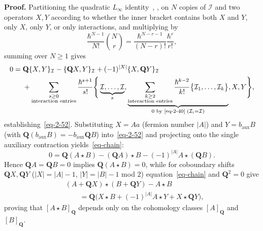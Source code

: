 \documentclass[11pt]{article}
\numberwithin{equation}{section}
\numberwithin{figure}{section}
\numberwithin{table}{section}
\begin{document}
\begin{proofbox}
\textbf{Proof.} Partitioning the quadratic $L_\infty$ identity~\cite[Section 3.2]{operatope}, \cite[Theorem 7]{Wang}, \cite[Eq.~(4.19)]{higher} on $N$ copies of $\mathcal I$ and two operators $X,Y$ according to whether the inner bracket contains both $X$ and $Y$, only $X$, only $Y$, or only interactions, and multiplying by
\begin{equation}\label{eq-quadratic-two}
\frac{\hbar^{N-1}}{N!}\binom Nr
=\frac{\hbar^{N-r-1}}{(N-r)!}\frac{\hbar^r}{r!},
\end{equation}
summing over $N\ge1$ gives
\begin{equation}\label{eq-quadratic-two-summed}
\begin{aligned}
0={}&\mathbf Q\{X,Y\}_{\mathcal I}
-\{\mathbf QX,Y\}_{\mathcal I}
+(-1)^{|X|}\{X,\mathbf QY\}_{\mathcal I}\\
&+\sum_{\substack{s\ge0\\\text{interaction entries}}}
\frac{\hbar^{s+1}}{s!}
\Bigg\{\underbrace{\mathcal I,\ldots,\mathcal I}_{s},
\underbrace{\sum_{\substack{k\ge2\\\text{interaction entries}}}
\frac{\hbar^{k-2}}{k!}\bigl\{\mathcal I_1,\ldots,\mathcal I_k\bigr\}}_{0\text{ by \eqref{eq-2-40}}\;(\mathcal I_i=\mathcal I)},X,Y\Bigg\},
\end{aligned}
\end{equation}
establishing~\eqref{eq-2-52}. Substituting $X=Aa$ (fermion number $|A|$) and $Y=b_{\mathrm{aux}}B$ (with $\mathbf Q(b_{\mathrm{aux}}B)=-b_{\mathrm{aux}}\mathbf QB$) into~\eqref{eq-2-52} and projecting onto the single auxiliary contraction yields~\eqref{eq-chain}:
\begin{equation*}
0=\mathbf Q(A\star B)-(\mathbf QA)\star B-(-1)^{|A|}A\star(\mathbf QB).
\end{equation*}
Hence $\mathbf QA=\mathbf QB=0$ implies $\mathbf Q(A\star B)=0$, while for coboundary shifts $\mathbf QX,\mathbf QY$ ($|X|=|A|-1$, $|Y|=|B|-1$ mod $2$) equation~\eqref{eq-chain} and $\mathbf Q^2=0$ give
\begin{equation}\label{eq-representatives}
\begin{aligned}
&(A+\mathbf QX)\star(B+\mathbf QY)-A\star B\\
&\qquad=\mathbf Q\bigl(X\star B+(-1)^{|A|}A\star Y
+X\star\mathbf QY\bigr),
\end{aligned}
\end{equation}
proving that $[A\star B]_{\mathbf Q}$ depends only on the cohomology classes $[A]_{\mathbf Q}$ and $[B]_{\mathbf Q}$.~\hfill\qedsymbol
\end{proofbox}
\end{document}
